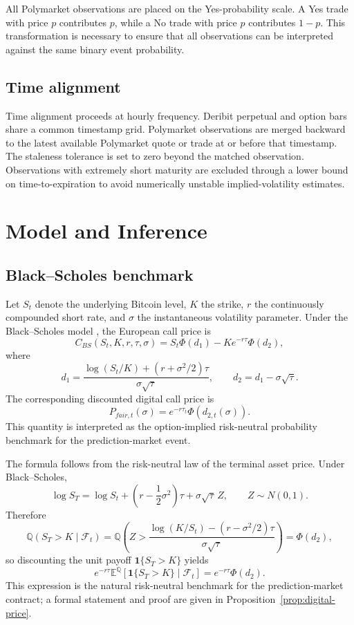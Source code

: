 \documentclass[11pt]{article}
\numberwithin{equation}{section}
\theoremstyle{plain}
\begin{document}
All Polymarket observations are placed on the Yes-probability scale. A Yes trade with price $p$ contributes $p$, while a No trade with price $p$ contributes $1-p$. This transformation is necessary to ensure that all observations can be interpreted against the same binary event probability.

\subsection{Time alignment}
Time alignment proceeds at hourly frequency. Deribit perpetual and option bars share a common timestamp grid. Polymarket observations are merged backward to the latest available Polymarket quote or trade at or before that timestamp. The staleness tolerance is set to zero beyond the matched observation. Observations with extremely short maturity are excluded through a lower bound on time-to-expiration to avoid numerically unstable implied-volatility estimates.

\section{Model and Inference}
\subsection{Black--Scholes benchmark}
Let $S_t$ denote the underlying Bitcoin level, $K$ the strike, $r$ the continuously compounded short rate, and $\sigma$ the instantaneous volatility parameter. Under the Black--Scholes model \citep{black1973}, the European call price is
\[
C_{BS}(S_t,K,r,\tau,\sigma)
=
S_t\Phi(d_1)-Ke^{-r\tau}\Phi(d_2),
\]
where
\[
d_1
=
\frac{\log(S_t/K)+(r+\sigma^2/2)\tau}{\sigma\sqrt{\tau}},
\qquad
d_2=d_1-\sigma\sqrt{\tau}.
\]
The corresponding discounted digital call price is
\[
P_{fair,t}(\sigma)
=
e^{-r\tau_t}\Phi(d_{2,t}(\sigma)).
\]
This quantity is interpreted as the option-implied risk-neutral probability benchmark for the prediction-market event.

The formula follows from the risk-neutral law of the terminal asset price. Under Black--Scholes,
\[
\log S_T
=
\log S_t+\left(r-\frac{1}{2}\sigma^2\right)\tau+\sigma\sqrt{\tau}\,Z,
\qquad
Z\sim N(0,1).
\]
Therefore
\[
\mathbb{Q}(S_T>K\mid\mathcal{F}_t)
=
\mathbb{Q}\!\left(
Z>
\frac{\log(K/S_t)-\left(r-\sigma^2/2\right)\tau}{\sigma\sqrt{\tau}}
\right)
=
\Phi(d_2),
\]
so discounting the unit payoff $\mathbf{1}\{S_T>K\}$ yields
\[
e^{-r\tau}\mathbb{E}^{\mathbb{Q}}\!\left[\mathbf{1}\{S_T>K\}\mid \mathcal{F}_t\right]
=
e^{-r\tau}\Phi(d_2).
\]
This expression is the natural risk-neutral benchmark for the prediction-market contract; a formal statement and proof are given in Proposition~\ref{prop:digital-price}.
\end{document}
